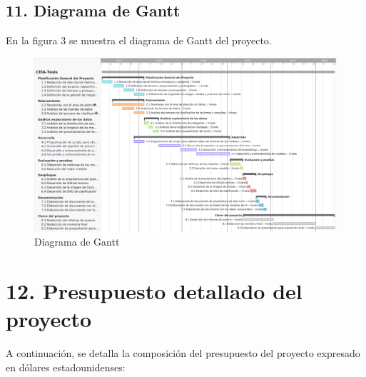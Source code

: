 \documentclass[
11pt, %
]{charter}
\begin{document}
\begin{landscape}
\section{11. Diagrama de Gantt}
\label{sec:gantt}

En la figura 3 se muestra el diagrama de Gantt del proyecto.

\begin{figure}[H]
\centering 
\includegraphics[height=.8\textheight]{./Figuras/figura3.png}
\caption{Diagrama de Gantt}
\label{fig:diagGantt}
\end{figure}
\end{landscape}



\section{12. Presupuesto detallado del proyecto}
\label{sec:presupuesto}


A continuación, se detalla la composición del presupuesto del proyecto expresado en dólares estadounidenses:

\end{document}

